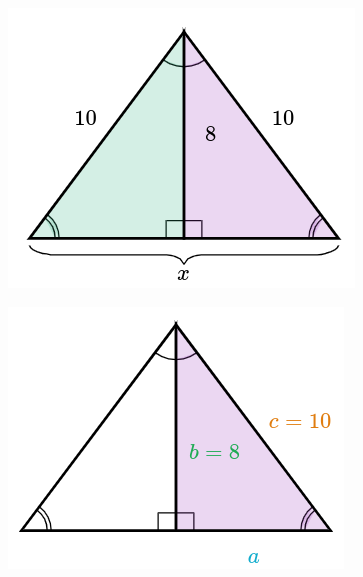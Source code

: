 \begin{solutionbox}{13cm}
    \begin{minipage}{0.2\textwidth}
        \begin{figure}[H]
            \centering
            \includegraphics[width=0.9\linewidth]{../images/pitagoras6a.png}
            \caption{}
            \label{fig:pitagoras_6a}
        \end{figure}
        \begin{figure}[H]
            \centering
            \includegraphics[width=0.9\linewidth]{../images/pitagoras6b.png}
            \caption{}
            \label{fig:pitagoras_6b}
        \end{figure}
        \begin{figure}[H]
            \centering

\end{figure}
\end{minipage}
\end{solutionbox}

